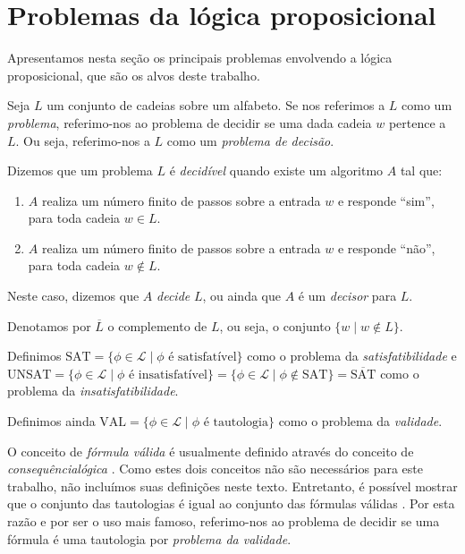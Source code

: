\section{Problemas da lógica proposicional}
\label{problemas_da_logica}

\indent

Apresentamos nesta seção os principais problemas envolvendo a lógica proposicional, que são os alvos deste trabalho.

\begin{definition}
	Seja $L$ um conjunto de cadeias sobre um alfabeto. Se nos referimos a $L$ como um \emph{problema}, referimo-nos ao problema de decidir se uma dada cadeia $w$ pertence a $L$. Ou seja, referimo-nos a $L$ como um \emph{problema de decisão}.
	
	Dizemos que um problema $L$ é \emph{decidível} quando existe um algoritmo $A$ tal que:
	\begin{enumerate}
		\item $A$ realiza um número finito de passos sobre a entrada $w$ e responde ``sim'', para toda cadeia $w \in L$.
		\item $A$ realiza um número finito de passos sobre a entrada $w$ e responde ``não'', para toda cadeia $w \notin L$.
	\end{enumerate}
	Neste caso, dizemos que $A$ \emph{decide} $L$, ou ainda que $A$ é um \emph{decisor} para $L$.
	
	Denotamos por $\overline{L}$ o complemento de $L$, ou seja, o conjunto $\{w \mid w \notin L \}$.
\end{definition}

\begin{definition}
	Definimos $\text{SAT} = \{\phi \in \mathcal{L} \mid \phi \text{ é satisfatível} \}$ como o problema da \emph{satisfatibilidade} e $\text{UNSAT} = \{\phi \in \mathcal{L} \mid \phi \text{ é insatisfatível} \} = \{\phi \in \mathcal{L} \mid \phi \notin \text{SAT} \} = \overline{\text{SAT}}$ como o problema da \emph{insatisfatibilidade}.
	
	Definimos ainda $\text{VAL} = \{\phi \in \mathcal{L} \mid \phi \text{ é tautologia} \}$ como o problema da \emph{validade}.
\end{definition}

O conceito de \emph{fórmula válida} é usualmente definido através do conceito de \emph{consequência\break lógica} \cite{kleene68book}. Como estes dois conceitos não são necessários para este trabalho, não incluímos suas definições neste texto. Entretanto, é possível mostrar que o conjunto das tautologias é igual ao conjunto das fórmulas válidas \cite{kleene68book}. Por esta razão e por ser o uso mais famoso, referimo-nos ao problema de decidir se uma fórmula é uma tautologia por \emph{problema da validade}.

